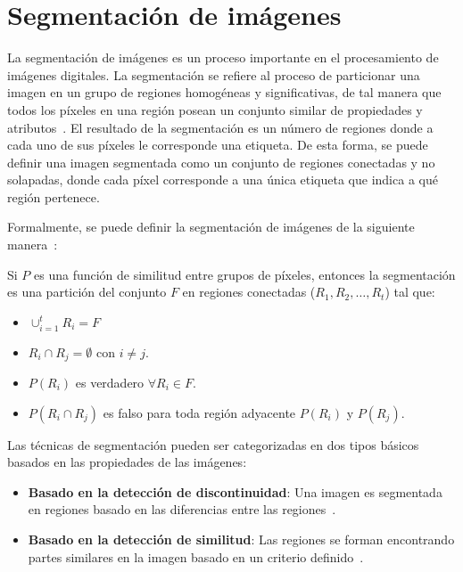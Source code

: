\section{Segmentación de imágenes}\label{section:seg}

La segmentación de imágenes es un proceso importante en el procesamiento de imágenes digitales. La segmentación se refiere al proceso de particionar una imagen en un grupo de regiones homogéneas y significativas, de tal manera que todos los píxeles en una región posean un conjunto similar de propiedades y atributos~\cite{sundararajan2017digital}. El resultado de la segmentación es un número de regiones donde a cada uno de sus píxeles le corresponde una etiqueta. De esta forma, se puede definir una imagen segmentada como un conjunto de regiones conectadas y no solapadas, donde cada píxel corresponde a una única etiqueta que indica a qué región pertenece.

Formalmente, se puede definir la segmentación de imágenes de la siguiente manera~\cite{pal1993review}:

\begin{definition}
	Si $P$ es una función de similitud entre grupos de píxeles, entonces la segmentación es una partición del conjunto $F$ en regiones conectadas ($R_1, R_2, \ldots, R_t$) tal que:
		\begin{itemize}
			\item $\cup_{i=1}^t R_i = F$
			\item $R_i \cap R_j = \emptyset$ con $i \neq j$.
			\item $P(R_i)$ es verdadero $\forall R_i \in F$.
			\item $P(R_i \cap R_j)$ es falso para toda región adyacente $P(R_i)$ y $P(R_j)$.
		\end{itemize}
\end{definition}

Las técnicas de segmentación pueden ser categorizadas en dos tipos básicos basados en las propiedades de las imágenes:

\begin{itemize}
	\item \textbf{Basado en la detección de discontinuidad}: Una imagen es segmentada en regiones basado en las diferencias entre las regiones~\cite{sundararajan2017digital}.
	\item \textbf{Basado en la detección de similitud}: Las regiones se forman encontrando partes similares en la imagen basado en un criterio definido~\cite{sundararajan2017digital}.
\end{itemize}

